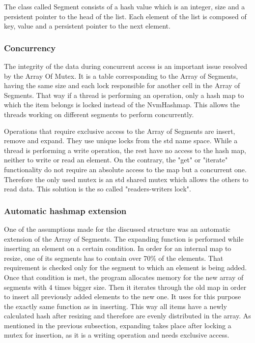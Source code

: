         The class called Segment consists of a hash value which is an integer, size and a persistent pointer to the head of the list. Each element of the list is composed of key, value and a persistent pointer to the next element.
        
    \subsubsection{Concurrency} %
        The integrity of the data during concurrent access is an important issue resolved by the Array Of Mutex. It is a table corresponding to the Array of Segments, having the same size and each lock responsible for another cell in the Array of Segments. That way if a thread is performing an operation, only a hash map to which the item belongs is locked instead of the NvmHashmap. This allows the threads working on different segments to perform concurrently.
        
        Operations that require exclusive access to the Array of Segments are insert, remove and expand. They use unique locks from the std name space. While a thread is performing a write operation, the rest have no access to the hash map, neither to write or read an element. On the contrary, the "get" or "iterate" functionality do not require an absolute access to the map but a concurrent one. Therefore the only used mutex is an std shared mutex which allows the others to read data. This solution is the so called "readers-writers lock". 
        
    \subsubsection{Automatic hashmap extension}
        One of the assumptions made for the discussed structure was an automatic extension of the Array of Segments. The expanding function is performed while inserting an element on a certain condition. In order for an internal map to resize, one of its segments has to contain over 70\% of the elements. That requirement is checked only for the segment to which an element is being added. Once that condition is met, the program allocates memory for the new array of segments with 4 times bigger size. Then it iterates through the old map in order to insert all previously added elements to the new one. It uses for this purpose the exactly same function as in inserting. This way all items have a newly calculated hash after resizing and therefore are evenly distributed in the array. As mentioned in the previous subsection, expanding takes place after locking a mutex for insertion, as it is a writing operation and needs exclusive access.


